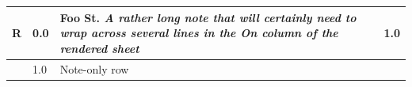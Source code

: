 \documentclass[11pt]{article}
\begin{document}
\renewcommand{\arraystretch}{1.15}
\twocolumn
{}
\tabletail{\hline}
\tablelasttail{\hline}
\begin{center}
  \begin{supertabular}{|c|p{0.30in}|p{2.25in}|l|}
  \hline
 \textbf{R} &   0.0 & Foo St. \newline \textit{A rather long note that will certainly need to wrap across several lines in the On column of the rendered sheet} &   1.0 \\ \hline
 \textbf{} &   1.0 & Note-only row &  \\ \hline

\end{supertabular}
\end{center}
\end{document}
